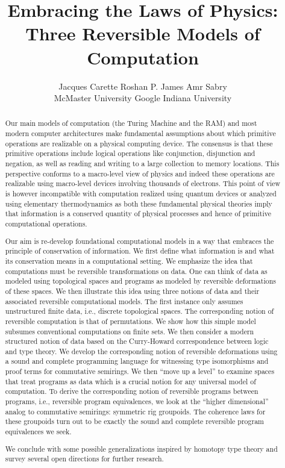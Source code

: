 \documentclass{article}
\title{Embracing the Laws of Physics: \\ Three Reversible Models of Computation}
\author{Jacques Carette \qquad\qquad Roshan P. James \qquad\qquad Amr Sabry \\
McMaster University \qquad\qquad Google \qquad\qquad Indiana University}
\begin{document}
\maketitle 

\begin{abstract}
  Our main models of computation (the Turing Machine and the RAM) and
  most modern computer architectures make fundamental assumptions
  about which primitive operations are realizable on a physical
  computing device. The consensus is that these primitive operations
  include logical operations like conjunction, disjunction and
  negation, as well as reading and writing to a large collection to
  memory locations. This perspective conforms to a macro-level view of
  physics and indeed these operations are realizable using macro-level
  devices involving thousands of electrons. This point of view is
  however incompatible with computation realized using quantum devices
  or analyzed using elementary thermodynamics as both these
  fundamental physical theories imply that information is a conserved
  quantity of physical processes and hence of primitive computational
  operations.

  Our aim is re-develop foundational computational models in a way
  that embraces the principle of conservation of information. We first
  define what information is and what its conservation means in a
  computational setting. We emphasize the idea that computations must
  be reversible transformations on data. One can think of data as
  modeled using topological spaces and programs as modeled by
  reversible deformations of these spaces. We then illustrate this
  idea using three notions of data and their associated reversible
  computational models. The first instance only assumes unstructured
  finite data, i.e., discrete topological spaces. The corresponding
  notion of reversible computation is that of permutations. We show
  how this simple model subsumes conventional computations on finite
  sets. We then consider a modern structured notion of data based on
  the Curry-Howard correspondence between logic and type theory. We
  develop the corresponding notion of reversible deformations using a
  sound and complete programming language for witnessing type
  isomorphisms and proof terms for commutative semirings.  We then
  ``move up a level'' to examine spaces that treat programs as data
  which is a crucial notion for any universal model of computation. To
  derive the corresponding notion of reversible programs between
  programs, i.e., reversible program equivalences, we look at the
  ``higher dimensional'' analog to commutative semirings: symmetric
  rig groupoids. The coherence laws for these groupoids turn out to be
  exactly the sound and complete reversible program equivalences we
  seek.
 
  We conclude with some possible generalizations inspired by homotopy
  type theory and survey several open directions for further research.

\end{abstract}
\end{document}
